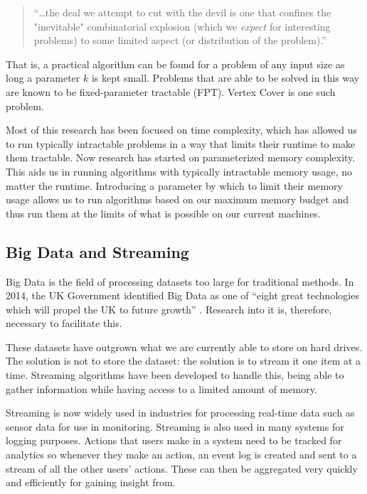\begin{quote}
    ``\dots the deal we attempt to cut with the devil is one that confines the
    "inevitable" combinatorial explosion (which we \textit{expect} for
    interesting problems) to some limited aspect (or distribution of the
    problem).''
\end{quote}

That is, a practical algorithm can be found for a problem of any input size as
long a parameter \(k\) is kept small. Problems that are able to be solved in this
way are known to be fixed-parameter tractable (FPT). Vertex Cover is one such
problem.

Most of this research has been focused on time complexity, which has allowed us
to run typically intractable problems in a way that limits their runtime to
make them tractable. Now research has started on parameterized memory
complexity. This aids us in running algorithms with typically intractable
memory usage, no matter the runtime. Introducing a parameter by which to limit
their memory usage allows us to run algorithms based on our maximum memory
budget and thus run them at the limits of what is possible on our current
machines.

\subsection{Big Data and Streaming}

Big Data is the field of processing datasets too large for traditional methods.
In 2014, the UK Government identified Big Data as one of ``eight great
technologies which will propel the UK to future growth''
\cite{intellectualpropertyoffice2014}. Research into it is, therefore,
necessary to facilitate this.

These datasets have outgrown what we are currently able to store on hard
drives. The solution is not to store the dataset: the solution is to stream it
one item at a time. Streaming algorithms have been developed to handle this,
being able to gather information while having access to a limited amount of
memory.

Streaming is now widely used in industries for processing real-time data such
as sensor data for use in monitoring. Streaming is also used in many systems
for logging purposes. Actions that users make in a system need to be tracked
for analytics so whenever they make an action, an event log is created and sent
to a stream of all the other users' actions. These can then be aggregated very
quickly and efficiently for gaining insight from.

